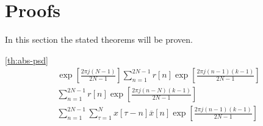 \documentclass[a4paper, openany, oneside]{memoir}
\begin{document}
\section{Proofs}
\label{sec:proofs_detection}
In this section the stated theorems will be proven.

\begin{blockProofTheorem}{\ref{th:abs-psd}}
    \begin{align*}
        \exp \left [ \frac{2\pi j (N-1)}{2N-1} \right] \sum_{n=1}^{2N-1} r[n] \exp \left[ \frac{2\pi j (n-1)(k-1)}{2N-1}\right] \\
        \sum_{n=1}^{2N-1} r[n] \exp \left[ \frac{2\pi j (n-N)(k-1)}{2N-1}\right] \\
        \sum_{n=1}^{2N-1} \sum_{\tau=1}^{N} x[\tau - n] \overline{x}[n] \exp \left[ \frac{2\pi j (n-1)(k-1)}{2N-1}\right]  \\        
    \end{align*}
\end{blockProofTheorem}
\end{document}
